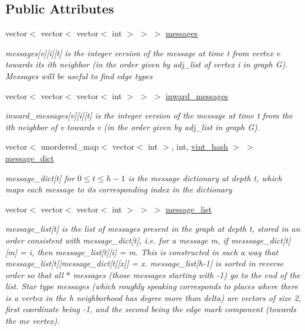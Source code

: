 \subsection*{Public Attributes}
\begin{DoxyCompactItemize}
\item 
vector$<$ vector$<$ vector$<$ int $>$ $>$ $>$ \hyperlink{classgraph__message_aac77e098f0acf9650116a8e51fe3b4b7}{messages}
\begin{DoxyCompactList}\small\item\em messages\mbox{[}v\mbox{]}\mbox{[}i\mbox{]}\mbox{[}t\mbox{]} is the integer version of the message at time t from vertex v towards its ith neighbor (in the order given by adj\+\_\+list of vertex i in graph G). Messages will be useful to find edge types \end{DoxyCompactList}\item 
vector$<$ vector$<$ vector$<$ int $>$ $>$ $>$ \hyperlink{classgraph__message_ab34dae49ed64132f2b1bbf626c509cd1}{inward\+\_\+messages}
\begin{DoxyCompactList}\small\item\em inward\+\_\+messages\mbox{[}v\mbox{]}\mbox{[}i\mbox{]}\mbox{[}t\mbox{]} is the integer version of the message at time t from the ith neighbor of v towards v (in the order given by adj\+\_\+list in graph G). \end{DoxyCompactList}\item 
vector$<$ unordered\+\_\+map$<$ vector$<$ int $>$, int, \hyperlink{structvint__hash}{vint\+\_\+hash} $>$ $>$ \hyperlink{classgraph__message_ab54d89b122c2b1322da0d5db2043fb84}{message\+\_\+dict}
\begin{DoxyCompactList}\small\item\em message\+\_\+dict\mbox{[}t\mbox{]} for $0 \leq t \leq h-1$ is the message dictionary at depth t, which maps each message to its corresponding index in the dictionary \end{DoxyCompactList}\item 
vector$<$ vector$<$ vector$<$ int $>$ $>$ $>$ \hyperlink{classgraph__message_aa17fdb629b423343edfafa97252763ef}{message\+\_\+list}
\begin{DoxyCompactList}\small\item\em message\+\_\+list\mbox{[}t\mbox{]} is the list of messages present in the graph at depth t, stored in an order consistent with message\+\_\+dict\mbox{[}t\mbox{]}, i.\+e. for a message m, if messsage\+\_\+dict\mbox{[}t\mbox{]}\mbox{[}m\mbox{]} = i, then message\+\_\+list\mbox{[}t\mbox{]}\mbox{[}i\mbox{]} = m. This is constructed in such a way that message\+\_\+list\mbox{[}t\mbox{]}\mbox{[}message\+\_\+dict\mbox{[}t\mbox{]}\mbox{[}x\mbox{]}\mbox{]} = x. message\+\_\+list\mbox{[}h-\/1\mbox{]} is sorted in reverse order so that all $\ast$ messages (those messages starting with -\/1) go to the end of the list. Star type messages (which roughly speaking corresponds to places where there is a vertex in the h neighborhood has degree more than delta) are vectors of size 2, first coordinate being -\/1, and the second being the edge mark component (towards the \textquotesingle{}me\textquotesingle{} vertex). \end{DoxyCompactList}\item 

\end{DoxyCompactItemize}
